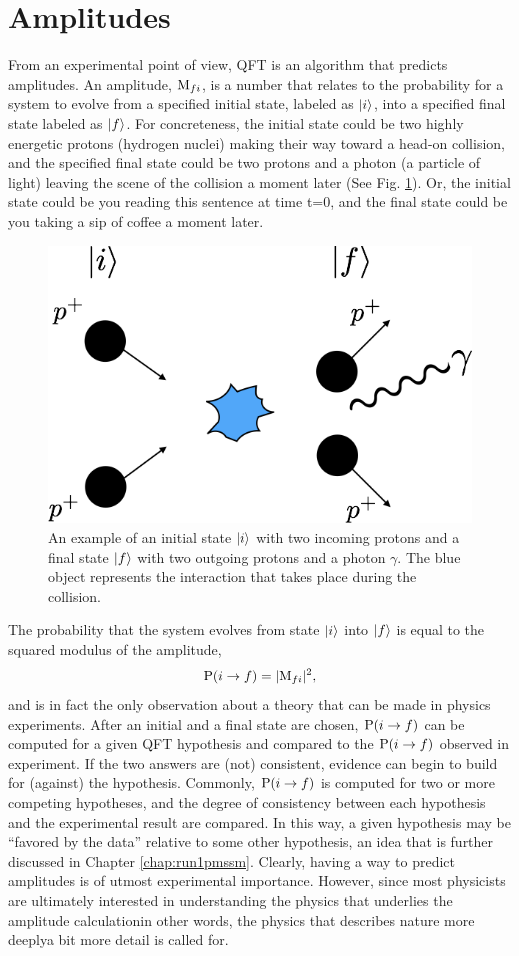 \section{Amplitudes}
\label{sec:Amp}
From an experimental point of view, QFT is an algorithm that predicts amplitudes. An amplitude, ${\rm M}_{fi}$, is a number that relates to the probability for a system to evolve from a specified initial state, labeled as $\ket{i}$,
into a specified final state labeled as $\ket{f}$. For concreteness, the initial state could be two highly energetic protons (hydrogen nuclei) making their way toward a head-on collision, and the specified final state could be two protons and a photon (a particle of light) leaving the scene of the collision a moment later (See Fig. \ref{fig:ifstates}). Or, the initial state could be you reading this sentence at time t=0, and the final state could be you taking a sip of coffee a moment later.
\begin{figure}[h]\centering
\includegraphics[width=.55\linewidth]{figures/QFT/istate_fstate.png}
\caption{An example of an initial state $\ket{i}$ with two incoming protons and a final state $\ket{f}$ with two outgoing protons and a photon $\gamma$. The blue object represents the interaction that takes place during the collision.}
\label{fig:ifstates}
\end{figure}
 The probability that the system evolves from state $\ket{i}$ into $\ket{f}$ is equal to the squared modulus of the amplitude,
\begin{equation}
{\rm P}(i\rightarrow f)=|{\rm M}_{fi}|^{2},
\label{eq:Amp}
\end{equation}
and is in fact the only observation about a theory that can be made in physics experiments. After an initial and a final state are chosen, ${\rm P}(i\rightarrow f)$ can be computed for a given QFT hypothesis and compared to the ${\rm P}(i\rightarrow f)$ observed in experiment. If the two answers are (not) consistent, evidence can begin to build for (against) the hypothesis. Commonly, ${\rm P}(i\rightarrow f)$ is computed for two or more competing hypotheses, and the degree of consistency between each hypothesis and the experimental result are compared. In this way, a given hypothesis may be ``favored by the data'' relative to some other hypothesis, an idea that is further discussed in Chapter \ref{chap:run1pmssm}. Clearly, having a way to predict amplitudes is of utmost experimental importance. However, since most physicists are ultimately interested in understanding the physics that underlies the amplitude calculation\textemdash in other words, the physics that describes nature more deeply\textemdash a bit more detail is called for.


